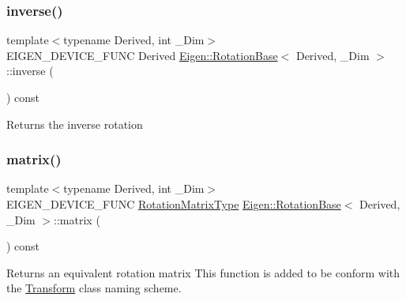 \subsubsection{\texorpdfstring{inverse()}{inverse()}}
{\footnotesize\ttfamily template$<$typename Derived, int \+\_\+\+Dim$>$ \\
E\+I\+G\+E\+N\+\_\+\+D\+E\+V\+I\+C\+E\+\_\+\+F\+U\+NC Derived \mbox{\hyperlink{class_eigen_1_1_rotation_base}{Eigen\+::\+Rotation\+Base}}$<$ Derived, \+\_\+\+Dim $>$\+::inverse (\begin{DoxyParamCaption}{ }\end{DoxyParamCaption}) const\hspace{0.3cm}{\ttfamily [inline]}}

\begin{DoxyReturn}{Returns}
the inverse rotation 
\end{DoxyReturn}
\mbox{\label{class_eigen_1_1_rotation_base_a14ce23df5f0b2593a466f8130fe6bac9}} 
\subsubsection{\texorpdfstring{matrix()}{matrix()}}
{\footnotesize\ttfamily template$<$typename Derived, int \+\_\+\+Dim$>$ \\
E\+I\+G\+E\+N\+\_\+\+D\+E\+V\+I\+C\+E\+\_\+\+F\+U\+NC \mbox{\hyperlink{class_eigen_1_1_rotation_base_a83602509674c9d635551998460342951}{Rotation\+Matrix\+Type}} \mbox{\hyperlink{class_eigen_1_1_rotation_base}{Eigen\+::\+Rotation\+Base}}$<$ Derived, \+\_\+\+Dim $>$\+::matrix (\begin{DoxyParamCaption}{ }\end{DoxyParamCaption}) const\hspace{0.3cm}{\ttfamily [inline]}}

\begin{DoxyReturn}{Returns}
an equivalent rotation matrix This function is added to be conform with the \mbox{\hyperlink{class_eigen_1_1_transform}{Transform}} class\textquotesingle{} naming scheme. 
\end{DoxyReturn}
\mbox{\label{class_eigen_1_1_rotation_base_aebcd2286f9c520e9d83cdb9a7287820c}} 
